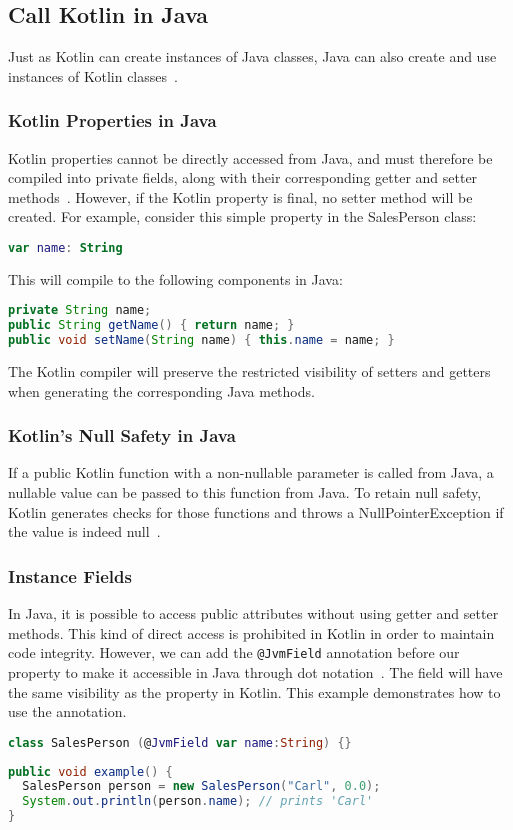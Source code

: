 \documentclass[a4paper,11pt]{article}
\begin{document}
\subsection{Call Kotlin in Java}
Just as Kotlin can create instances of Java classes, Java can also create and use instances of Kotlin classes~\cite{interop-java}.

\subsubsection{Kotlin Properties in Java}
Kotlin properties cannot be directly accessed from Java, and must therefore be compiled into private fields, along with their corresponding getter and setter methods~\cite{interop-properties}. However, if the Kotlin property is final, no setter method will be created. For example, consider this simple property in the SalesPerson class:
\begin{lstlisting}[language=Kotlin]
var name: String
\end{lstlisting}
This will compile to the following components in Java:
\begin{lstlisting}[language=Java]
private String name;
public String getName() { return name; }
public void setName(String name) { this.name = name; }
\end{lstlisting}
The Kotlin compiler will preserve the restricted visibility of setters and getters when generating the corresponding Java methods.

\subsubsection{Kotlin's Null Safety in Java}
If a public Kotlin function with a non-nullable parameter is called from Java, a nullable value can be passed to this function from Java. To retain null safety, Kotlin generates checks for those functions and throws a NullPointerException if the value is indeed null~\cite{interop-java-null-safety}.

\subsubsection{Instance Fields}
In Java, it is possible to access public attributes without using getter and setter methods. This kind of direct access is prohibited in Kotlin in order to maintain code integrity. However, we can add the \texttt{@JvmField} annotation before our property to make it accessible in Java through dot notation~\cite{interop-instance-fields}. The field will have the same visibility as the property in Kotlin.
This example demonstrates how to use the annotation.
\begin{lstlisting}[language=Kotlin]
class SalesPerson (@JvmField var name:String) {}
\end{lstlisting}
\begin{lstlisting}[language=Java]
public void example() {
  SalesPerson person = new SalesPerson("Carl", 0.0);
  System.out.println(person.name); // prints 'Carl'
}
\end{lstlisting}
\end{document}
